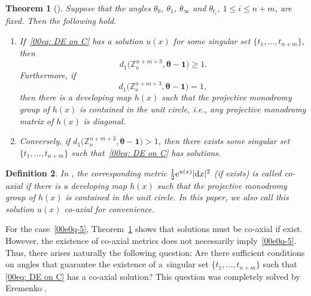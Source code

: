 \documentclass[pdftex]{sigma}
\numberwithin{equation}{section}
\newtheorem{Theorem}{Theorem}[section]
\newtheorem{Definition}[Theorem]{Definition}
\def\Z{\mathbb Z}
\begin{document}
\begin{Theorem}[{\cite{Mondello-Panov}}]\label{thm-MP}
 Suppose that the angles $\theta_0$, $\theta_1$, $\theta_\infty$ and
 $\theta_{t_i}$, $1\le i\le n+m$, are fixed. Then the following
 hold.
\begin{enumerate}\itemsep=0pt
\item[$1.$]
If~\eqref{00eq: DE on C} has a solution $u(x)$ for some singular set $\{t_1,\dots,t_{n+m}\}$, then
\[d_1\bigl(\Z_o^{n+m+3},{\boldsymbol\theta-\boldsymbol 1}\bigr)\geq 1.\]
Furthermore, if
 \begin{equation}\label{00e0q-5}
d_1\bigl(\Z_o^{n+m+3},{\boldsymbol\theta-\boldsymbol 1}\bigr)=1,
\end{equation}
then there is a developing map $h(x)$ such that the projective
monodromy group of $h(x)$ is contained in the unit circle, i.e., any
projective monodromy matrix of $h(x)$ is diagonal.

\item[$2.$]
Conversely, if $d_1\bigl(\Z_o^{n+m+3},{\boldsymbol\theta-\boldsymbol 1}\bigr)>1$, then there exists some singular set $\{t_1,\dots, t_{n+m}\}$ such that~\eqref{00eq: DE on C} has solutions.
\end{enumerate}
\end{Theorem}

\begin{Definition}
In \cite{Mondello-Panov}, the corresponding metric
$\frac12{\rm e}^{u(x)}|{\rm d}x|^2$ (if exists) is called \emph{co-axial} if there
is a developing map $h(x)$ such that the projective monodromy group of
$h(x)$ is contained in the unit circle. In this paper, we also call
this solution $u(x)$ \emph{co-axial} for convenience.
\end{Definition}

For the case~\eqref{00e0q-5}, Theorem~\ref{thm-MP} shows that solutions must be
co-axial if exist. However, the existence of co-axial metrics does not
necessarily imply~\eqref{00e0q-5}. Thus, there arises naturally the
following question: Are there sufficient conditions on angles that
guarantee the existence of a~singular set $\{t_1,\dots,t_{n+m}\}$ such that
\eqref{00eq: DE on C} has a co-axial solution? This question was
completely solved by Eremenko \cite{Coaxial}.
\end{document}
